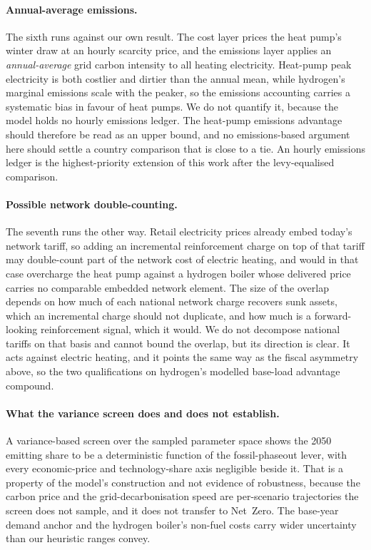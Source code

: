 \paragraph{Annual-average emissions.} The sixth runs against our own result. The cost
layer prices the heat pump's winter draw at an hourly scarcity price, and the emissions
layer applies an \emph{annual-average} grid carbon intensity to all heating electricity.
Heat-pump peak electricity is both costlier and dirtier than the annual mean, while
hydrogen's marginal emissions scale with the peaker, so the emissions accounting carries
a systematic bias in favour of heat pumps. We do not quantify it, because the model holds
no hourly emissions ledger. The heat-pump emissions advantage should therefore be read as an upper bound, and no emissions-based argument here should settle a country comparison that
is close to a tie.  An hourly
emissions ledger is the highest-priority extension of this work after the levy-equalised
comparison.

\paragraph{Possible network double-counting.} The seventh runs the other way. Retail
electricity prices already embed today's network tariff, so adding an incremental
reinforcement charge on top of that tariff may double-count part of the network cost of
electric heating, and would in that case overcharge the heat pump against a hydrogen boiler whose
delivered price carries no comparable embedded network element. The size of the overlap
depends on how much of each national network charge recovers sunk assets, which an
incremental charge should not duplicate, and how much is a forward-looking reinforcement
signal, which it would. We do not decompose national tariffs on that basis and cannot
bound the overlap, but its direction is clear. It acts against electric heating, and it
points the same way as the fiscal asymmetry above, so the two qualifications on
hydrogen's modelled base-load advantage compound.

\paragraph{What the variance screen does and does not establish.} A variance-based screen
over the sampled parameter space shows the 2050 emitting share to be a deterministic
function of the fossil-phaseout lever, with every economic-price and technology-share axis
negligible beside it. That is a property of the model's construction and not evidence of
robustness, because the carbon price and the grid-decarbonisation speed are per-scenario
trajectories the screen does not sample, and it does not transfer to Net~Zero. The
base-year demand anchor and the hydrogen boiler's non-fuel costs carry wider uncertainty
than our heuristic ranges convey.
